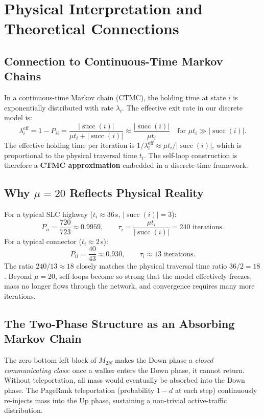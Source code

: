 \documentclass[12pt,a4paper]{article}
\theoremstyle{definition}
\theoremstyle{plain}
\begin{document}
\section{Physical Interpretation and Theoretical Connections}
\label{sec:physics}

\subsection{Connection to Continuous-Time Markov Chains}

In a continuous-time Markov chain (CTMC), the holding time at state $i$ is
exponentially distributed with rate $\lambda_i$. The effective exit rate in our
discrete model is:
\[
  \lambda_i^{\mathrm{eff}} = 1 - P_{ii} = \frac{|\operatorname{succ}(i)|}{\mu t_i +
  |\operatorname{succ}(i)|} \approx \frac{|\operatorname{succ}(i)|}{\mu t_i}
  \quad \text{for } \mu t_i \gg |\operatorname{succ}(i)|.
\]
The effective holding time per iteration is $1/\lambda_i^{\mathrm{eff}} \approx \mu t_i /
|\operatorname{succ}(i)|$, which is proportional to the physical traversal time $t_i$.
The self-loop construction is therefore a \textbf{CTMC approximation} embedded in a
discrete-time framework.

\subsection{Why $\mu=20$ Reflects Physical Reality}

For a typical SLC highway ($t_i \approx 36$\,s, $|\operatorname{succ}(i)|=3$):
\[
  P_{ii} = \frac{720}{723} \approx 0.9959, \qquad
  \tau_i = \frac{\mu t_i}{|\operatorname{succ}(i)|} = 240 \text{ iterations}.
\]
For a typical connector ($t_i \approx 2$\,s):
\[
  P_{ii} = \frac{40}{43} \approx 0.930, \qquad \tau_i \approx 13 \text{ iterations}.
\]
The ratio $240/13 \approx 18$ closely matches the physical traversal time ratio $36/2=18$.
Beyond $\mu=20$, self-loops become so strong that the model effectively freezes, mass
no longer flows through the network, and convergence requires many more iterations.

\subsection{The Two-Phase Structure as an Absorbing Markov Chain}

The zero bottom-left block of $M_{2N}$ makes the Down phase a \emph{closed communicating
class}: once a walker enters the Down phase, it cannot return. Without teleportation,
all mass would eventually be absorbed into the Down phase. The PageRank teleportation
(probability $1-d$ at each step) continuously re-injects mass into the Up phase,
sustaining a non-trivial active-traffic distribution.
\end{document}
